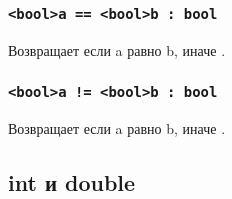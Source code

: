 \documentclass[a4paper, 14pt]{extarticle}
\begin{document}
\subsubsection{\lstinline`<bool>a == <bool>b : bool`}
Возвращает  если a равно b, иначе .

\subsubsection{\lstinline`<bool>a != <bool>b : bool`}
Возвращает  если a равно b, иначе .

\subsection{{\color{bluemarin}int} и {\color{bluemarin}double}}
\end{document}
